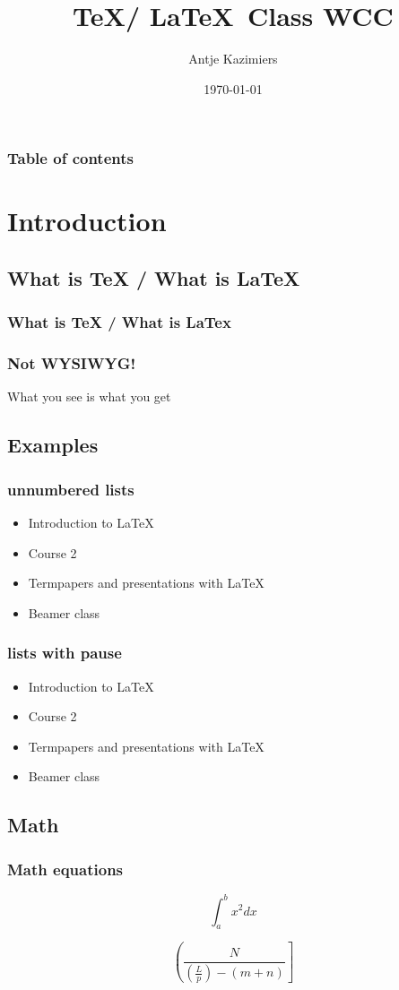 \documentclass{beamer}
\begin{document}
\title{\TeX / \LaTeX \, Class WCC}
\author{Antje Kazimiers}
\date{\today}
\begin{frame}
\titlepage
\end{frame}

\begin{frame}\frametitle{Table of contents}
    \tableofcontents
\end{frame}


\section{Introduction}
\subsection{What is TeX / What is \LaTeX}
\begin{frame}
    \frametitle{What is TeX / What is LaTex}
\end{frame}

\begin{frame}
    \frametitle{Not WYSIWYG!}
    What you see is what you get
\end{frame}


\subsection{Examples}
\begin{frame}\frametitle{unnumbered lists}
\begin{itemize}
    \item Introduction to  \LaTeX
    \item Course 2
    \item Termpapers and presentations with \LaTeX
    \item Beamer class
\end{itemize}
\end{frame}

\begin{frame}\frametitle{lists with pause}
\begin{itemize}
    \item Introduction to  \LaTeX \pause
    \item Course 2 \pause
    \item Termpapers and presentations with \LaTeX \pause
    \item Beamer class
\end{itemize}
\end{frame}

\subsection{Math}
\begin{frame}\frametitle{Math equations}
$$\int_{a}^{b} x^2 dx $$

\[\left(  \frac{ N } { \left( \frac{L}{p} \right)  - (m+n) }  \right]   \]
\end{frame}
\end{document}
